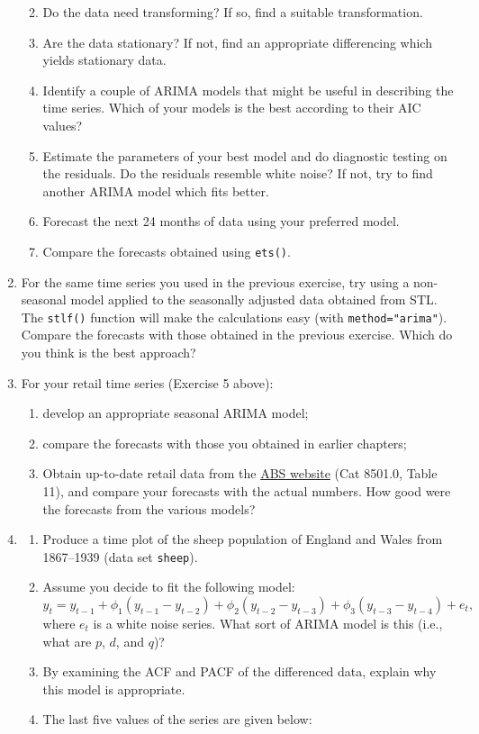 \documentclass[]{book}
\providecommand{\tightlist}{%
  \setlength{\itemsep}{0pt}\setlength{\parskip}{0pt}}
\begin{document}
\begin{enumerate}
  \begin{enumerate}
  \def\labelenumii{(\alph{enumii})}
  \tightlist
  \item
    Do the data need transforming? If so, find a suitable transformation.
  \item
    Are the data stationary? If not, find an appropriate differencing which yields stationary data.
  \item
    Identify a couple of ARIMA models that might be useful in describing the time series. Which of your models is the best according to their AIC values?
  \item
    Estimate the parameters of your best model and do diagnostic testing on the residuals. Do the residuals resemble white noise? If not, try to find another ARIMA model which fits better.
  \item
    Forecast the next 24 months of data using your preferred model.
  \item
    Compare the forecasts obtained using \texttt{ets()}.
  \end{enumerate}
\item
  For the same time series you used in the previous exercise, try using a non-seasonal model applied to the seasonally adjusted data obtained from STL. The \texttt{stlf()} function will make the calculations easy (with \texttt{method="arima"}). Compare the forecasts with those obtained in the previous exercise. Which do you think is the best approach?
\item
  For your retail time series (Exercise 5 above):

  \begin{enumerate}
  \def\labelenumii{\alph{enumii}.}
  \tightlist
  \item
    develop an appropriate seasonal ARIMA model;
  \item
    compare the forecasts with those you obtained in earlier chapters;
  \item
    Obtain up-to-date retail data from the \href{https://goo.gl/twfCyD}{ABS website} (Cat 8501.0, Table 11), and compare your forecasts with the actual numbers. How good were the forecasts from the various models?
  \end{enumerate}
\item
  \begin{enumerate}
  \def\labelenumii{\alph{enumii}.}
  \item
    Produce a time plot of the sheep population of England and Wales from 1867--1939 (data set \texttt{sheep}).
  \item
    Assume you decide to fit the following model:
    \[
       y_t = y_{t-1} + \phi_1(y_{t-1}-y_{t-2}) + \phi_2(y_{t-2}-y_{t-3}) + \phi_3(y_{t-3}-y_{t-4}) + e_t,
     \]
    where \(e_t\) is a white noise series. What sort of ARIMA model is this (i.e., what are \(p\), \(d\), and \(q\))?
  \item
    By examining the ACF and PACF of the differenced data, explain why this model is appropriate.
  \item
    The last five values of the series are given below:


\end{enumerate}
\end{enumerate}
\end{document}
